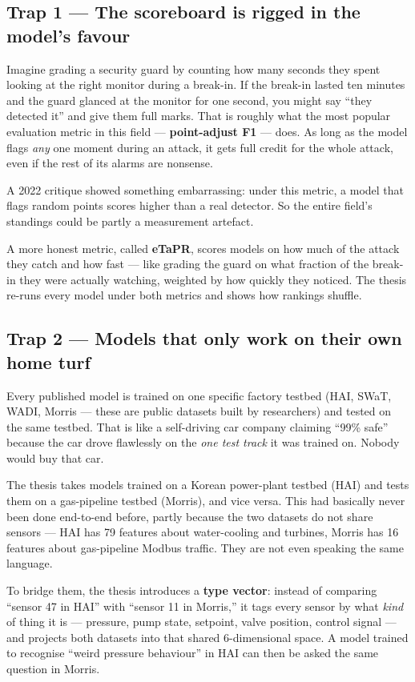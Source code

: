 \documentclass[11pt,a4paper]{article}
\begin{document}
\subsection{Trap 1 --- The scoreboard is rigged in the model's favour}

Imagine grading a security guard by counting how many seconds they spent looking at the right monitor during a break-in. If the break-in lasted ten minutes and the guard glanced at the monitor for one second, you might say ``they detected it'' and give them full marks. That is roughly what the most popular evaluation metric in this field --- \textbf{point-adjust F1} --- does. As long as the model flags \emph{any} one moment during an attack, it gets full credit for the whole attack, even if the rest of its alarms are nonsense.

A 2022 critique showed something embarrassing: under this metric, a model that flags random points scores higher than a real detector. So the entire field's standings could be partly a measurement artefact.

A more honest metric, called \textbf{eTaPR}, scores models on how much of the attack they catch and how fast --- like grading the guard on what fraction of the break-in they were actually watching, weighted by how quickly they noticed. The thesis re-runs every model under both metrics and shows how rankings shuffle.

\subsection{Trap 2 --- Models that only work on their own home turf}

Every published model is trained on one specific factory testbed (HAI, SWaT, WADI, Morris --- these are public datasets built by researchers) and tested on the same testbed. That is like a self-driving car company claiming ``99\% safe'' because the car drove flawlessly on the \emph{one test track} it was trained on. Nobody would buy that car.

The thesis takes models trained on a Korean power-plant testbed (HAI) and tests them on a gas-pipeline testbed (Morris), and vice versa. This had basically never been done end-to-end before, partly because the two datasets do not share sensors --- HAI has 79 features about water-cooling and turbines, Morris has 16 features about gas-pipeline Modbus traffic. They are not even speaking the same language.

To bridge them, the thesis introduces a \textbf{type vector}: instead of comparing ``sensor 47 in HAI'' with ``sensor 11 in Morris,'' it tags every sensor by what \emph{kind} of thing it is --- pressure, pump state, setpoint, valve position, control signal --- and projects both datasets into that shared 6-dimensional space. A model trained to recognise ``weird pressure behaviour'' in HAI can then be asked the same question in Morris.
\end{document}

